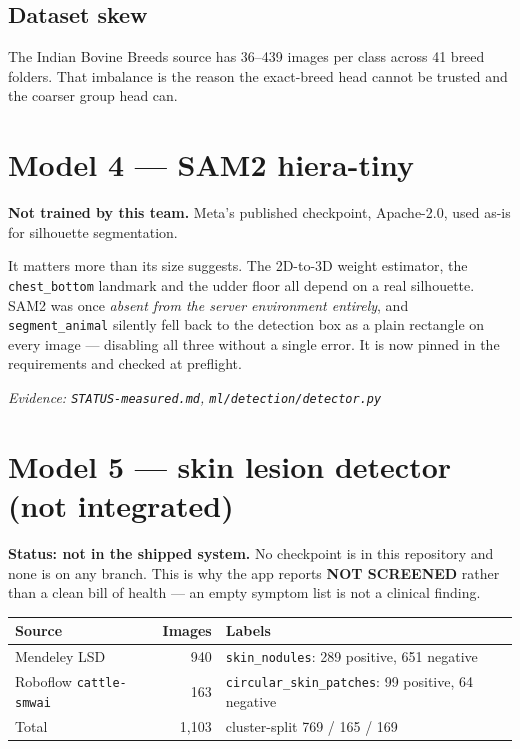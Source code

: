 \documentclass[11pt,a4paper]{article}
\newcommand{\evidence}[1]{{\small\color{soft}\textit{Evidence: #1}}}
\begin{document}
\subsection*{Dataset skew}

The Indian Bovine Breeds source has 36--439 images per class across 41
breed folders. That imbalance is the reason the exact-breed head cannot be
trusted and the coarser group head can.

\section{Model 4 --- SAM2 hiera-tiny}

\textbf{Not trained by this team.} Meta's published checkpoint, Apache-2.0,
used as-is for silhouette segmentation.

It matters more than its size suggests. The 2D-to-3D weight estimator, the
\texttt{chest\_bottom} landmark and the udder floor all depend on a real
silhouette. SAM2 was once \emph{absent from the server environment entirely},
and \texttt{segment\_animal} silently fell back to the detection box as a plain
rectangle on every image --- disabling all three without a single error. It is
now pinned in the requirements and checked at preflight.

\evidence{\texttt{STATUS-measured.md}, \texttt{ml/detection/detector.py}}

\section{Model 5 --- skin lesion detector (not integrated)}

\textbf{Status: not in the shipped system.} No checkpoint is in this
repository and none is on any branch. This is why the app reports
\textbf{NOT SCREENED} rather than a clean bill of health --- an empty symptom
list is not a clinical finding.

\begin{tabular}{@{}lrp{6.4cm}@{}}
\toprule
\textbf{Source} & \textbf{Images} & \textbf{Labels} \\
\midrule
Mendeley LSD & 940 & \texttt{skin\_nodules}: 289 positive, 651 negative \\
Roboflow \texttt{cattle-smwai} & 163 & \texttt{circular\_skin\_patches}: 99 positive, 64 negative \\
\midrule
Total & 1{,}103 & cluster-split 769 / 165 / 169 \\
\bottomrule
\end{tabular}
\end{document}
